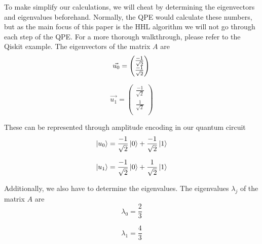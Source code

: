 To make simplify our calculations, we will cheat by determining the eigenvectors and eigenvalues beforehand.
Normally, the QPE would calculate these numbers, but as the main focus of this paper is the HHL algorithm we will not go through each step of the QPE.
For a more thorough walkthrough, please refer to the Qiskit example.
The eigenvectors of the matrix $A$ are
\begin{equation}
\vec{u_0} = \begin{pmatrix} \frac{-1}{\sqrt{2}}\\ \frac{-1}{\sqrt{2}}\\ \end{pmatrix}\\
\end{equation}

\begin{equation}
\vec{u_1} = \begin{pmatrix} \frac{-1}{\sqrt{2}}\\ \frac{1}{\sqrt{2}}\\ \end{pmatrix}
\end{equation}

These can be represented through amplitude encoding in our quantum circuit
\begin{equation}
\ket{u_0} = \frac{-1}{\sqrt{2}}\ket{0} + \frac{-1}{\sqrt{2}}\ket{1}
\end{equation}

\begin{equation}
\ket{u_1}= \frac{-1}{\sqrt{2}}\ket{0} + \frac{1}{\sqrt{2}}\ket{1} 
\end{equation}

Additionally, we also have to determine the eigenvalues. The eigenvalues $\lambda_j$ of the matrix $A$ are
\begin{equation}
\lambda_0 = \frac{2}{3}
\end{equation}

\begin{equation}
\lambda_1 = \frac{4}{3}
\end{equation}

